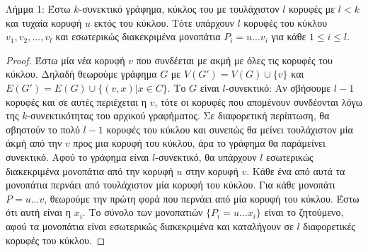 \documentclass[a4paper, oneside, 11pt]{article}
\theoremstyle{definition}
\begin{document}
\begin{enumerate}
Λήμμα 1: Έστω $k$-συνεκτικό γράφημα, κύκλος του με τουλάχιστον $l$ κορυφές με $l<k$ και τυχαία κορυφή $u$ εκτός του κύκλου. Τότε υπάρχουν $l$ κορυφές του κύκλου $v_1, v_2, ..., v_l$ και 
εσωτερικώς διακεκριμένα μονοπάτια $P_i = u...v_i$ για κάθε $1\leq i\leq l$.
\begin{proof}
Έστω μία νέα κορυφή $v$ που συνδέεται με ακμή με όλες τις κορυφές του κύκλου. Δηλαδή θεωρούμε γράφημα $G$ με $V(G')=V(G)\cup \{v\}$ και $E(G')=E(G)\cup \{(v,x)|x\in C\}$. Το $G$ είναι $l$-συνεκτικό:
Αν σβήσουμε $l-1$ κορυφές και σε αυτές περιέχεται η $v$, τότε οι κορυφές που απομένουν συνδέονται λόγω της $k$-συνεκτικότητας του αρχικού γραφήματος. Σε διαφορετική περίπτωση, θα σβηστούν το πολύ $l-1$
κορυφές του κύκλου και συνεπώς θα μείνει τουλάχιστον μία άκμή από την $v$ προς μια κορυφή του κύκλου, άρα το γράφημα θα παράμείνει συνεκτικό. Αφού το γράφημα είναι $l$-συνεκτικό, θα υπάρχουν $l$ εσωτερικώς
διακεκριμένα μονοπάτια από την κορυφή $u$ στην κορυφή $v$. Κάθε ένα από αυτά τα μονοπάτια περνάει από τουλάχιστον μία κορυφή του κύκλου. Για κάθε μονοπάτι $P = u...v$, θεωρούμε την πρώτη φορά που περνάει
από μία κορυφή του κύκλου. Έστω ότι αυτή είναι η $x_i$. Το σύνολο των μονοπατιών $\{P_i = u...x_i\}$ είναι το ζητούμενο, αφού τα μονοπάτια είναι εσωτερικώς διακεκριμένα και καταλήγουν σε $l$ διαφορετικές
κορυφές του κύκλου.

\end{proof}

\end{enumerate}
\end{document}
